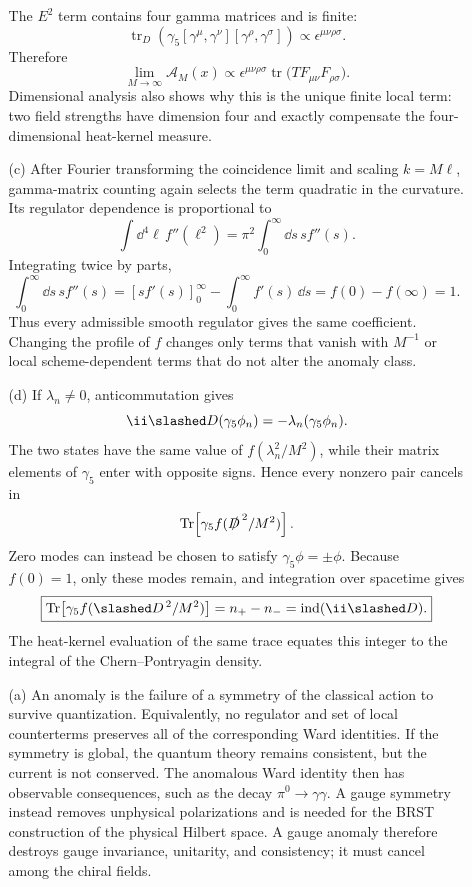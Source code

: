 \begin{enumerate}
\begin{enumerate}
    The \(E^2\) term contains four gamma matrices and is finite:
    \[
      \operatorname{tr}_D\!
        \left(\gamma_5
         [\gamma^\mu,\gamma^\nu]
         [\gamma^\rho,\gamma^\sigma]\right)
        \propto\epsilon^{\mu\nu\rho\sigma}.
    \]
    Therefore
    \[
      \lim_{M\to\infty}\mathcal A_M(x)
        \propto
        \epsilon^{\mu\nu\rho\sigma}
        \operatorname{tr}
         \bigl(TF_{\mu\nu}F_{\rho\sigma}\bigr).
    \]
    Dimensional analysis also shows why this is the unique finite local
    term: two field strengths have dimension four and exactly compensate
    the four-dimensional heat-kernel measure.
    \item[(c)]
    After Fourier transforming the coincidence limit and scaling
    \(k=M\ell\), gamma-matrix counting again selects the term quadratic in
    the curvature.  Its regulator dependence is proportional to
    \[
      \int \dd^4\ell\,f''(\ell^2)
        =\pi^2\int_0^\infty \dd s\,s f''(s).
    \]
    Integrating twice by parts,
    \[
      \int_0^\infty \dd s\,s f''(s)
        =[sf'(s)]_0^\infty-\int_0^\infty f'(s)\,\dd s
        =f(0)-f(\infty)=1.
    \]
    Thus every admissible smooth regulator gives the same coefficient.
    Changing the profile of \(f\) changes only terms that vanish with
    \(M^{-1}\) or local scheme-dependent terms that do not alter the
    anomaly class.
    \item[(d)]
    If \(\lambda_n\neq0\), anticommutation gives
    \[
      \ii\slashed D(\gamma_5\phi_n)
        =-\lambda_n(\gamma_5\phi_n).
    \]
    The two states have the same value of
    \(f(\lambda_n^2/M^2)\), while their matrix elements of \(\gamma_5\)
    enter with opposite signs.  Hence every nonzero pair cancels in
    \[
      \operatorname{Tr}\!
        \left[\gamma_5f(\slashed D^{\,2}/M^2)\right].
    \]
    Zero modes can instead be chosen to satisfy
    \(\gamma_5\phi=\pm\phi\).  Because \(f(0)=1\), only these modes remain,
    and integration over spacetime gives
    \[
      \boxed{\operatorname{Tr}\!
        \left[\gamma_5f(\slashed D^{\,2}/M^2)\right]
        =n_+-n_-=\operatorname{ind}(\ii\slashed D).}
    \]
    The heat-kernel evaluation of the same trace equates this integer to
    the integral of the Chern--Pontryagin density.
  \end{enumerate}

  \begin{enumerate}
    \item[(a)]
    An anomaly is the failure of a symmetry of the classical action to
    survive quantization.  Equivalently, no regulator and set of local
    counterterms preserves all of the corresponding Ward identities.  If
    the symmetry is global, the quantum theory remains consistent, but
    the current is not conserved.  The anomalous Ward identity then has
    observable consequences, such as the decay
    \(\pi^0\to\gamma\gamma\).  A gauge symmetry instead removes
    unphysical polarizations and is needed for the BRST construction of
    the physical Hilbert space.  A gauge anomaly therefore destroys gauge
    invariance, unitarity, and consistency; it must cancel among the
    chiral fields.


\end{enumerate}
\end{enumerate}
